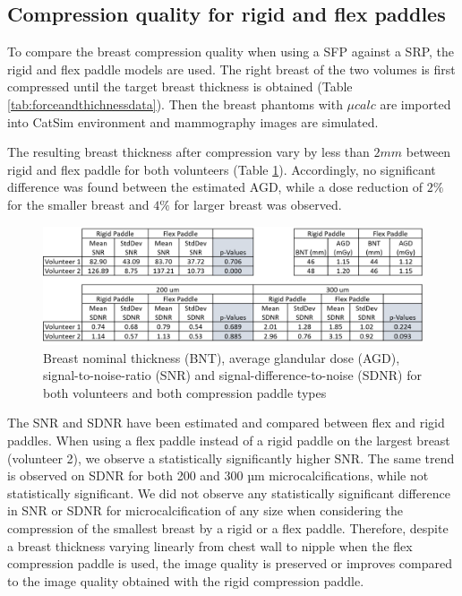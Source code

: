\subsection{Compression quality for rigid and flex paddles}

To compare the breast compression quality when using a SFP against a SRP, the rigid and flex paddle models are used. The right breast of the two volumes is first compressed until the target breast thickness is obtained (Table \ref{tab:forceandthichnessdata}). Then the breast phantoms with $\mu calc $ are imported into CatSim environment and mammography images are simulated.

The resulting breast thickness after compression vary by less than $2mm$ between rigid and flex paddle for both volunteers (Table \ref{fig:table_compression_results}). Accordingly, no significant difference was found between the estimated AGD, while a dose reduction of $2\%$ for the smaller breast and $4\%$ for larger breast was observed.

\begin{figure}[!h]
\centering
\includegraphics[width=\textwidth,keepaspectratio]{figures/table_compression_results.png} 
\caption{Breast nominal thickness (BNT), average glandular dose (AGD), signal-to-noise-ratio (SNR) and signal-difference-to-noise (SDNR) for both volunteers and both compression paddle types}\label{fig:table_compression_results}
\end{figure}

The SNR and SDNR have been estimated and compared between flex and rigid paddles. When using a flex paddle instead of a rigid paddle on the largest breast (volunteer 2), we observe a statistically significantly higher SNR. The same trend is observed on SDNR for both 200 and 300 µm microcalcifications, while not statistically significant. We did not observe any statistically significant difference in SNR or SDNR for microcalcification of any size when considering the compression of the smallest breast by a rigid or a flex paddle. Therefore, despite a breast thickness varying linearly from chest wall to nipple when the flex compression paddle is used, the image quality is preserved or improves compared to the image quality obtained with the rigid compression paddle.

